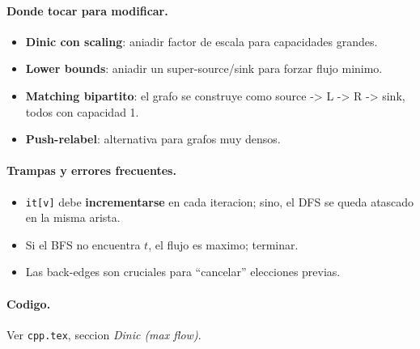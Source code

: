 \paragraph{Donde tocar para modificar.}
\begin{itemize}\setlength\itemsep{0pt}
	\item \textbf{Dinic con scaling}: aniadir factor de escala para capacidades grandes.
	\item \textbf{Lower bounds}: aniadir un super-source/sink para forzar flujo minimo.
	\item \textbf{Matching bipartito}: el grafo se construye como source -> L -> R -> sink, todos con capacidad 1.
	\item \textbf{Push-relabel}: alternativa para grafos muy densos.
\end{itemize}

\paragraph{Trampas y errores frecuentes.}
\begin{itemize}\setlength\itemsep{0pt}
	\item \texttt{it[v]} debe \textbf{incrementarse} en cada iteracion; sino, el DFS se queda atascado en la misma arista.
	\item Si el BFS no encuentra $t$, el flujo es maximo; terminar.
	\item Las back-edges son cruciales para ``cancelar'' elecciones previas.
\end{itemize}

\paragraph{Codigo.}
Ver \texttt{cpp.tex}, seccion \textit{Dinic (max flow)}.

\vspace{0.5em}
